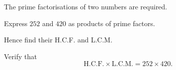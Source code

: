  The prime factorisations of two numbers are required.
\begin{subparts}
  \item Express $252$ and $420$ as products of prime factors.
  \item Hence find their H.C.F. and L.C.M.
  \item Verify that
  \[
  \text{H.C.F.}\times\text{L.C.M.}=252\times420.
  \]
\end{subparts}
